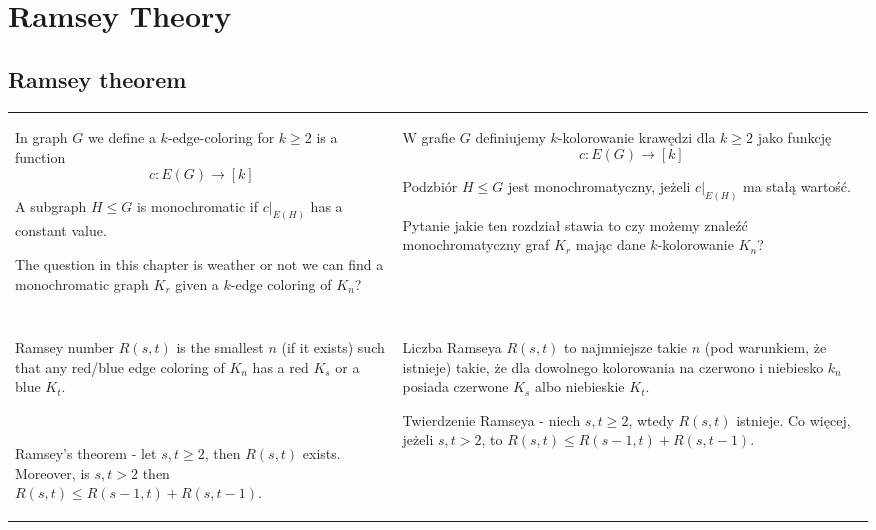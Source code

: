 \section{Ramsey Theory}

\subsection{Ramsey theorem}

\begin{tabularx}{\textwidth}{ X!{\color{git90gray}\vrule} X}

    In graph $G$ we define a {\color{def}$k$-edge-coloring} for $k\geq2$ is a function
    $$c:E(G)\to[k]$$

    A subgraph $H\leq G$ is {\color{def}monochromatic} if $c|_{E(H)}$ has a constant value.
    \medskip

    The question in this chapter is weather or not we can find a monochromatic graph $K_r$ given a $k$-edge coloring of $K_n$?
    
    &

    W grafie $G$ definiujemy $k$-kolorowanie krawędzi dla $k\geq2$ jako funkcję
    $$c:E(G)\to[k]$$

    Podzbiór $H\leq G$ jest {\color{def}monochromatyczny}, jeżeli $c|_{E(H)}$ ma stałą wartość.
    \medskip

    Pytanie jakie ten rozdział stawia to czy możemy znaleźć monochromatyczny graf $K_r$ mając dane $k$-kolorowanie $K_n$?

    \\

    & \\

    \hline 

    & \\

    {\color{def}Ramsey number} $R(s, t)$ is the smallest $n$ (if it exists) such that any red/blue edge coloring of $K_n$ has a red $K_s$ or a blue $K_t$.
    \medskip

    $ $

    {\color{def}Ramsey's theorem} - let $s,t\geq2$, then $R(s, t)$ exists. Moreover, is $s,t>2$ then $R(s,t)\leq R(s-1, t)+R(s, t-1)$.

    &

    {\color{def}Liczba Ramseya} $R(s,t)$ to najmniejsze takie $n$ (pod warunkiem, że istnieje) takie, że dla dowolnego kolorowania na czerwono i niebiesko $k_n$ posiada czerwone $K_s$ albo niebieskie $K_t$.
    \medskip

    {\color{def}Twierdzenie Ramseya} - niech $s,t\geq2$, wtedy $R(s, t)$ istnieje. Co więcej, jeżeli $s,t>2$, to $R(s,t)\leq R(s-1,t)+R(s,t-1)$.

\end{tabularx}

